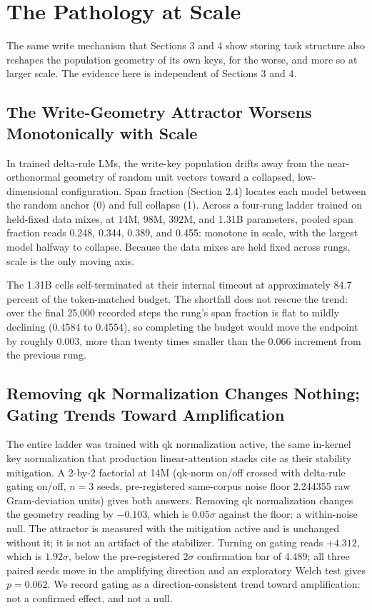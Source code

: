 \section{The Pathology at Scale}

The same write mechanism that Sections 3 and 4 show storing task
structure also reshapes the population geometry of its own keys, for
the worse, and more so at larger scale. The evidence here is
independent of Sections 3 and 4.

\subsection{The Write-Geometry Attractor Worsens Monotonically with Scale}

In trained delta-rule LMs, the write-key population drifts away from
the near-orthonormal geometry of random unit vectors toward a
collapsed, low-dimensional configuration. Span fraction (Section 2.4)
locates each model between the random anchor (0) and full collapse (1).
Across a four-rung ladder trained on held-fixed data mixes, at 14M,
98M, 392M, and 1.31B parameters, pooled span fraction reads 0.248,
0.344, 0.389, and 0.455: monotone in scale, with
the largest model halfway to collapse. Because the data mixes are held
fixed across rungs, scale is the only moving axis.

The 1.31B cells self-terminated at their internal timeout at
approximately 84.7 percent of the token-matched budget. The shortfall does not
rescue the trend: over the final 25,000 recorded steps the rung's span
fraction is flat to mildly declining (0.4584 to 0.4554), so completing the budget would move the endpoint
by roughly 0.003, more than twenty times smaller than the 0.066
increment from the previous rung.

\subsection{Removing qk Normalization Changes Nothing; Gating Trends Toward Amplification}

The entire ladder was trained with qk normalization active, the same
in-kernel key normalization that production linear-attention stacks
cite as their stability mitigation. A 2-by-2 factorial at 14M
(qk-norm on/off crossed with delta-rule gating on/off, $n{=}3$ seeds,
pre-registered same-corpus noise floor 2.244355 raw Gram-deviation
units) gives both answers. Removing qk normalization changes the
geometry reading by $-0.103$, which is $0.05\sigma$ against the floor:
a within-noise null. The attractor is measured
with the mitigation active and is unchanged without it; it is not an
artifact of the stabilizer. Turning on gating reads $+4.312$, which is
$1.92\sigma$, below the pre-registered $2\sigma$ confirmation bar of
4.489; all three paired seeds move in the
amplifying direction and an exploratory Welch test gives $p = 0.062$. We record gating as a direction-consistent trend
toward amplification: not a confirmed effect, and not a null.

